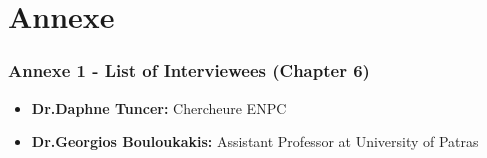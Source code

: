 \chapter{Annexe}
\subsection*{\Large Annexe 1 - List of Interviewees (Chapter 6)}

\begin{itemize}
    \item \textbf{Dr.Daphne Tuncer:} Chercheure ENPC
    \item \textbf{Dr.Georgios Bouloukakis:} Assistant Professor at University of Patras
\end{itemize}







    \newpage





